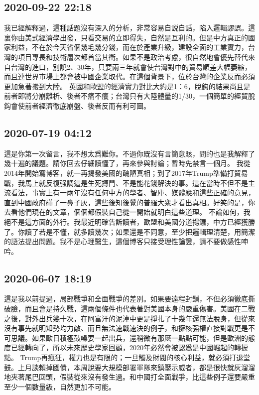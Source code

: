 \documentclass[twocolumn]{ctexart}
\begin{document}
\subsection*{2020-09-22 22:18}

我已經解釋過，這種話題沒有深入的分析，非常容易自説自話，陷入邏輯謬誤。這裏你由美式經濟學出發，只看交易的立即得失，自然是互利的。但是中方真正的國家利益，不在於今天省個幾毛幾分錢，而在於產業升級，建設全面的工業實力，台灣的項目專長和技術層次都首當其衝。如果不是政治考慮，很自然地會優先替代來自台灣的進口，別說2、30年，只要兩三年就會使台灣對中的貿易順差大幅萎縮，而且連世界市場上都會被中國企業取代。在這個背景下，位於台灣的企業反而必須更加急著搬到大陸。
英國和歐盟的經濟實力對比大約是1：6，脫鈎的結果尚且是前者即將分崩離析、後者不痛不癢；台灣只有大陸體量的1/30，一個簡單的經貿脫鈎會使前者經濟徹底崩盤、後者反而有利可圖。
\subsection*{2020-07-19 04:12}

這是你第一次留言，我不想太爲難你。不過你既沒有言簡意賅，問的也是我解釋了幾十遍的議題。請你回去仔細讀懂了，再來參與討論；暫時先禁言一個月。
我從2014年開始寫博客，就一再揭發美國的醜陋真相；到了2017年Trump準備打貿易戰，我馬上就反復强調這是生死搏鬥、不是能花錢解決的事。這在當時不但不是主流看法，事實上有一兩年沒有任何中方的學者、智庫、媒體應和這些正確的意見，直到中國政府碰了一鼻子灰，這些後知後覺的普羅大衆才看出真相。好笑的是，你去看他們現在的文章，個個都假裝自己從一開始就明白這些道理。
不論如何，我絕不是這方面的外行。我最近明確告訴讀者，歐盟和美國分道揚鑣，中方已經獲勝了。你讀了若是不懂，就多讀幾次；如果還是不同意，至少把邏輯理清楚，用簡潔的語法提出問題。我不是心理醫生，這個博客只接受理性論證，請不要做感性呻吟。
\subsection*{2020-06-07 18:19}

這是我以前提過，局部戰爭和全面戰爭的差別。如果要遠程封鎖，不但必須徹底撕破臉，而且會是持久戰，這兩個條件也代表著對美國本身的嚴重傷害。美國在二戰之後，對外出兵幾十次，在阿富汗的泥淖中更是掙扎了十幾年還無法脫身，但從來沒有事先就明知勢均力敵、而且無法速戰速決的例子，和擁核强權直接對戰更是不可思議。如果歐日積極鼓噪要一起出兵，還稍微有那麽一點點可能，但是歐洲的態度已經轉向了，所以未來歷史學家回顧，2020年必然會被認爲是中國崛起的轉捩點。
Trump再瘋狂，權力也是有限的；一旦觸及財閥的核心利益，就必須打退堂鼓。上月談賴掉國債，本周說要大規模部署軍隊來鎮壓示威者，都是很快就灰溜溜地夾著尾巴回頭，假裝從來沒有發生過。和中國打全面戰爭，比這些例子還要嚴重至少一個數量級，自然更加不可能。
\end{document}
